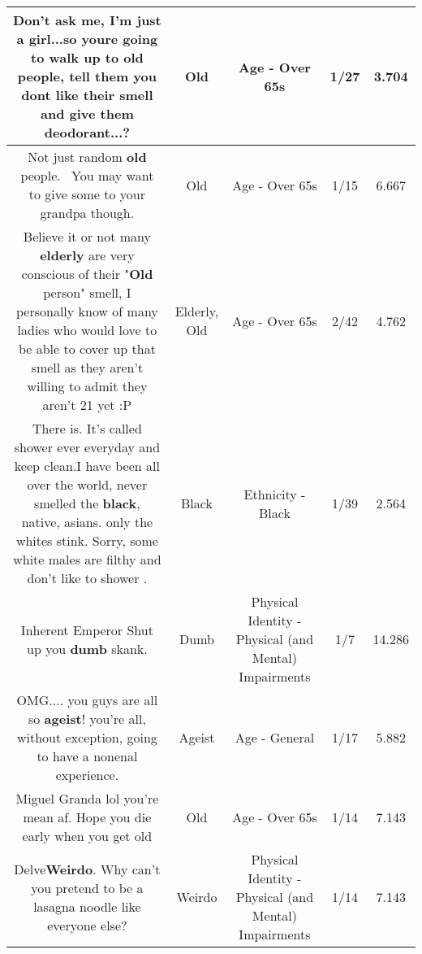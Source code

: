 \documentclass[11pt]{article}
\newlength\mylength
\begin{document}
\begin{center}
\begin{longtable}{|C{.65\mylength}|C{.30\mylength}|C{.12\mylength}|C{.12\mylength}|C{.12\mylength}|}
  \small Don't ask me, I'm just a girl...so youre going to walk up to \textbf{old} people, tell them you dont like their smell and give them deodorant...?\normalsize   & Old & Age - Over 65s & 1/27 & 3.704 \\  \hline
  \small Not just random \textbf{old} people.  You may want to give some to your grandpa though.\normalsize   & Old & Age - Over 65s & 1/15 & 6.667 \\  \hline
  \small Believe it or not many \textbf{elderly} are very conscious of their "\textbf{Old} person" smell, I personally know of many ladies who would love to be able to cover up that smell as they aren't willing to admit they aren't 21 yet :P\normalsize   & Elderly, Old & Age - Over 65s & 2/42 & 4.762 \\  \hline
  \small There is. It's called shower ever everyday and keep clean.I have been all over the world, never smelled the \textbf{black}, native, asians. only the whites stink. Sorry, some white males are filthy and don't like to shower .\normalsize   & Black & Ethnicity - Black & 1/39 & 2.564 \\  \hline
  \small Inherent Emperor Shut up you \textbf{dumb} skank.\normalsize   & Dumb & Physical Identity - Physical (and Mental) Impairments & 1/7 & 14.286 \\  \hline
  \small OMG.... you guys are all so \textbf{ageist}!  you're all, without exception, going to have a nonenal experience.\normalsize   & Ageist & Age - General & 1/17 & 5.882 \\  \hline
  \small Miguel Granda lol you're mean af. Hope you die early when you get old\normalsize   & Old & Age - Over 65s & 1/14 & 7.143 \\  \hline
  \small Delve\textbf{Weirdo}. Why can't you pretend to be a lasagna noodle like everyone else?\normalsize   & Weirdo & Physical Identity - Physical (and Mental) Impairments & 1/14 & 7.143 \\  \hline

\end{longtable}
\end{center}
\end{document}
